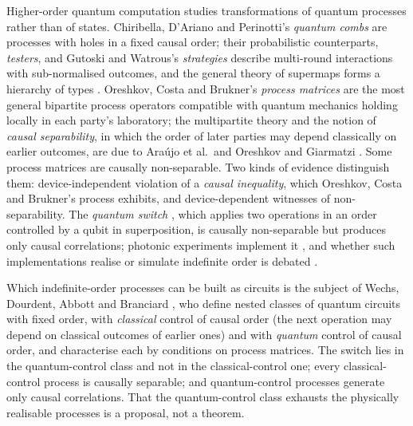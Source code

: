 Higher-order quantum computation studies transformations of quantum processes rather than of states. Chiribella, D'Ariano and Perinotti's \emph{quantum combs} \cite{quantum_circuit_architecture_Chiribella_2008,chiribella2009networks} are processes with holes in a fixed causal order; their probabilistic counterparts, \emph{testers}, and Gutoski and Watrous's \emph{strategies} \cite{gutoski2007games} describe multi-round interactions with sub-normalised outcomes, and the general theory of supermaps forms a hierarchy of types \cite{bisio2019hoqt}. Oreshkov, Costa and Brukner's \emph{process matrices} \cite{oreshkov2012noncausal} are the most general bipartite process operators compatible with quantum mechanics holding locally in each party's laboratory; the multipartite theory and the notion of \emph{causal separability}, in which the order of later parties may depend classically on earlier outcomes, are due to Araújo et al.\ and Oreshkov and Giarmatzi \cite{araujo2015witnessing,oreshkov2016separable}. Some process matrices are causally non-separable. Two kinds of evidence distinguish them: device-independent violation of a \emph{causal inequality}, which Oreshkov, Costa and Brukner's process exhibits, and device-dependent witnesses of non-separability. The \emph{quantum switch} \cite{chiribella2013switch}, which applies two operations in an order controlled by a qubit in superposition, is causally non-separable \cite{araujo2015witnessing} but produces only causal correlations; photonic experiments implement it \cite{procopio2015experimental}, and whether such implementations realise or simulate indefinite order is debated \cite{oreshkov2019timedelocalized,wechs2023timedelocalised}.

Which indefinite-order processes can be built as circuits is the subject of Wechs, Dourdent, Abbott and Branciard \cite{wechs2021qcqc}, who define nested classes of quantum circuits with fixed order, with \emph{classical} control of causal order (the next operation may depend on classical outcomes of earlier ones) and with \emph{quantum} control of causal order, and characterise each by conditions on process matrices. The switch lies in the quantum-control class and not in the classical-control one; every classical-control process is causally separable; and quantum-control processes generate only causal correlations. That the quantum-control class exhausts the physically realisable processes is a proposal, not a theorem.

